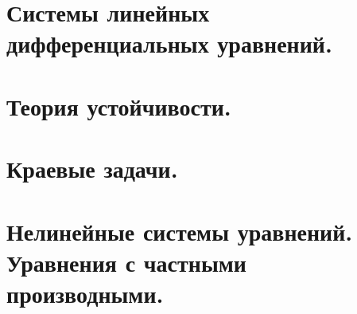 \documentclass[fleqn, 12pt, a4paper, titlepage]{extarticle}
\begin{document}
		
		\section*{Системы линейных дифференциальных уравнений.}
		

		
		\section*{Теория устойчивости.}
		

		
		\section*{Краевые задачи.}
		

		
		\section*{Нелинейные системы уравнений. Уравнения с частными производными.}
		
\end{document}
